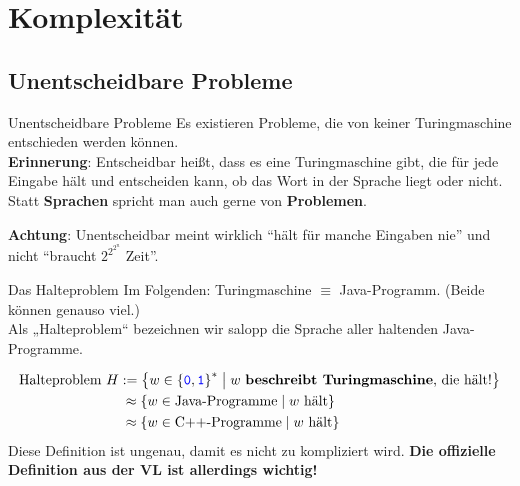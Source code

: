 \section{Komplexität}

\subsection{Unentscheidbare Probleme}
\begin{frame}{Unentscheidbare Probleme}
	Es existieren Probleme, die von keiner Turingmaschine entschieden werden können.\\ \pause
	\textbf{Erinnerung}: Entscheidbar heißt, dass es eine Turingmaschine gibt, die für jede Eingabe hält und entscheiden kann, ob das Wort in der Sprache liegt oder nicht. Statt \textbf{Sprachen} spricht man auch gerne von \textbf{Problemen}.\\ \pause
	
	\bigskip
	\textbf{Achtung}: Unentscheidbar meint wirklich \enquote{hält für manche Eingaben nie} und nicht \enquote{braucht $2^{2^{2^{n}}}$ Zeit}.
\end{frame}

\begin{frame}{Das Halteproblem}
	Im Folgenden: Turingmaschine $\equiv$ Java-Programm. {\small (Beide können genauso viel.)}\\ \pause
	\bigskip
	Als „Halteproblem“ bezeichnen wir salopp die Sprache aller haltenden Java-Programme.
	\begin{Definition} 
		\vspace{-1.5\baselineskip}
		\begin{align*}
		\text{Halteproblem } H &:= \left\{w \in \left\{\hbox{\textcolor{blue}{\texttt{0}}}, \hbox{\textcolor{blue}{\texttt{1}}}\right\}^* \;\middle|\; w \text{ \textbf{beschreibt Turingmaschine}, die hält!}\right\} \\
		&\:\approx \left\{w \in \text{Java-Programme} \;\middle|\; w \text{ hält}\right\} \\
		&\:\approx \left\{w \in \text{C++-Programme} \;\middle|\; w \text{ hält}\right\}
		\end{align*}
		Diese Definition ist ungenau, damit es nicht zu kompliziert wird. \textbf{Die offizielle Definition aus der VL ist allerdings wichtig!}
	\end{Definition}
\end{frame}

